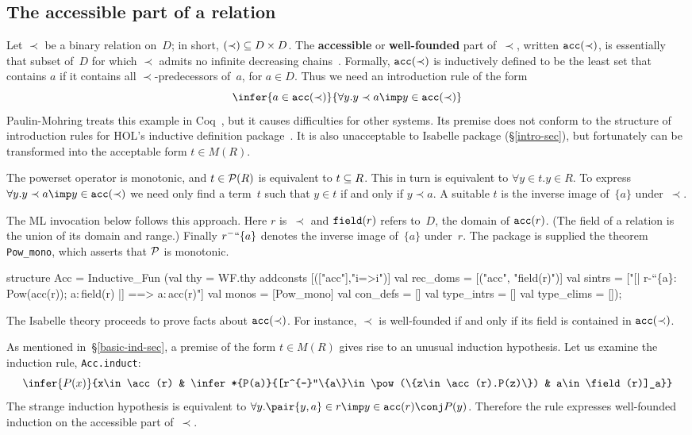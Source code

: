 \subsection{The accessible part of a relation}\label{acc-sec}
Let $\prec$ be a binary relation on~$D$; in short, $(\prec)\subseteq D\times D$.
The {\bf accessible} or {\bf well-founded} part of~$\prec$, written
$\hbox{\tt acc}(\prec)$, is essentially that subset of~$D$ for which $\prec$ admits
no infinite decreasing chains~\cite{aczel77}.  Formally, $\hbox{\tt acc}(\prec)$ is
inductively defined to be the least set that contains $a$ if it contains
all $\prec$-predecessors of~$a$, for $a\in D$.  Thus we need an
introduction rule of the form 
\[ \infer{a\in\acc(\prec)}{\forall y.y\prec a\imp y\in\acc(\prec)} \]
Paulin-Mohring treats this example in Coq~\cite{paulin92}, but it causes
difficulties for other systems.  Its premise does not conform to 
the structure of introduction rules for HOL's inductive definition
package~\cite{camilleri92}.  It is also unacceptable to Isabelle package
(\S\ref{intro-sec}), but fortunately can be transformed into the acceptable
form $t\in M(R)$.

The powerset operator is monotonic, and $t\in{\cal P}(R)$ is equivalent to
$t\subseteq R$.  This in turn is equivalent to $\forall y\in t. y\in R$.  To
express $\forall y.y\prec a\imp y\in\acc(\prec)$ we need only find a
term~$t$ such that $y\in t$ if and only if $y\prec a$.  A suitable $t$ is
the inverse image of~$\{a\}$ under~$\prec$.

The ML invocation below follows this approach.  Here $r$ is~$\prec$ and
$\hbox{\tt field}(r)$ refers to~$D$, the domain of $\hbox{\tt acc}(r)$.  (The field of a
relation is the union of its domain and range.)  Finally
$r^{-}``\{a\}$ denotes the inverse image of~$\{a\}$ under~$r$.  The package is
supplied the theorem {\tt Pow\_mono}, which asserts that ${\cal P}$ is monotonic.
\begin{ttbox}
structure Acc = Inductive_Fun
 (val thy        = WF.thy addconsts [(["acc"],"i=>i")]
  val rec_doms   = [("acc", "field(r)")]
  val sintrs     = ["[| r-``\{a\}:\,Pow(acc(r)); a:\,field(r) |] ==> a:\,acc(r)"]
  val monos      = [Pow_mono]
  val con_defs   = []
  val type_intrs = []
  val type_elims = []);
\end{ttbox}
The Isabelle theory proceeds to prove facts about $\hbox{\tt acc}(\prec)$.  For
instance, $\prec$ is well-founded if and only if its field is contained in
$\hbox{\tt acc}(\prec)$.  

As mentioned in~\S\ref{basic-ind-sec}, a premise of the form $t\in M(R)$
gives rise to an unusual induction hypothesis.  Let us examine the
induction rule, {\tt Acc.induct}:
\[ \infer{P(x)}{x\in\acc(r) &
     \infer*{P(a)}{[r^{-}``\{a\}\in\pow(\{z\in\acc(r).P(z)\}) & 
                   a\in\field(r)]_a}}
\]
The strange induction hypothesis is equivalent to
$\forall y. \pair{y,a}\in r\imp y\in\acc(r)\conj P(y)$.
Therefore the rule expresses well-founded induction on the accessible part
of~$\prec$.

